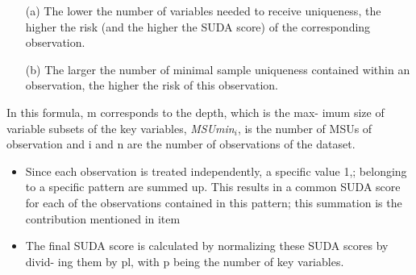 \documentclass[]{article}
\begin{document}
\begin{itemize}
\item[(a)] The lower the number of variables needed to receive uniqueness, the higher
the risk (and the higher the SUDA score) of the corresponding observation.
\item[(b)] The larger the number of minimal sample uniqueness contained within an
observation, the higher the risk of this observation.
\end{itemize}



 In this formula, m corresponds to the depth, which is the max-
imum size of variable subsets of the key variables, \textit{MSUmin}$_i$, is the number of
MSUs of observation and i and n are the number of observations of the dataset.
\begin{itemize}
\item Since each observation is treated independently, a speciﬁc value 1,; belonging to a
speciﬁc pattern are summed up. This results in a common SUDA score for each
of the observations contained in this pattern; this summation is the contribution
mentioned in item 
\item The ﬁnal SUDA score is calculated by normalizing these SUDA scores by divid-
ing them by pl, with p being the number of key variables.
\end{itemize}

\newpage
\end{document}
